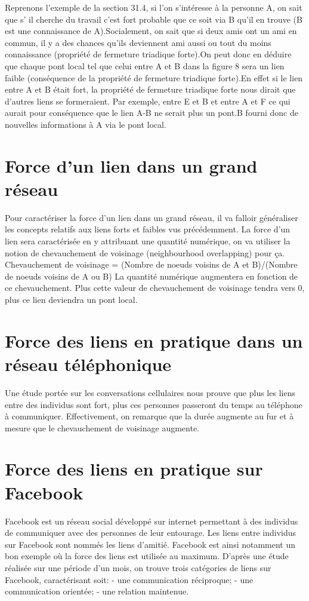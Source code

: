 Reprenons l'exemple de la section 31.4, si l'on s'intéresse à la personne A, on sait que s' il cherche du travail c'est fort probable que ce soit via B qu'il en trouve (B est une connaissance de A).Socialement, on sait que si deux amis ont un ami en commun, il y a des chances qu'ils deviennent ami aussi ou tout du moins connaissance (propriété de fermeture triadique forte).On peut donc en déduire que chaque pont local tel que celui entre A et B dans la figure 8 sera un lien faible (conséquence de la propriété de fermeture triadique forte).En effet si le lien entre A et B était fort, la propriété de fermeture triadique forte nous dirait que d'autres liens se formeraient. Par exemple, entre E et B et entre A et F ce qui aurait pour conséquence que le lien A-B ne serait plus un pont.B fourni donc de nouvelles informations à A via le pont local.
\newline
\section{Force d'un lien dans un grand réseau}
Pour caractériser la force d'un lien dans un grand réseau, il va falloir généraliser les concepts relatifs aux liens forts et faibles vus précédemment.
La force d'un lien sera caractérisée en y attribuant une quantité numérique, on va utiliser la notion de chevauchement de voisinage (neighbourhood overlapping) pour ça.
Chevauchement de voisinage = (Nombre de noeuds voisins de A et B)/(Nombre de noeuds voisins de A ou B)
La quantité numérique augmentera en fonction de ce chevauchement. Plus cette valeur de chevauchement de voisinage tendra vers 0, plus ce lien deviendra un pont local.
\newline
\section{Force des liens en pratique dans un réseau téléphonique}
Une étude portée sur les conversations cellulaires nous prouve que plus les liens entre des individus sont fort, plus ces personnes passeront du temps au téléphone à communiquer. Effectivement, on remarque que la durée augmente au fur et à mesure que le chevauchement de voisinage augmente.
\newline
\section{Force des liens en pratique sur Facebook}
Facebook est un réseau social développé sur internet permettant à des individus de communiquer avec des personnes de leur entourage.
Les liens entre individus sur Facebook sont nommés les liens d'amitié.
Facebook est ainsi notamment un bon exemple où la force des liens est utilisée au maximum.
D'après une étude réalisée sur une période d'un mois, on trouve trois catégories de liens sur Facebook, caractérisant soit:
- une communication réciproque;
- une communication orientée;
- une relation maintenue.

